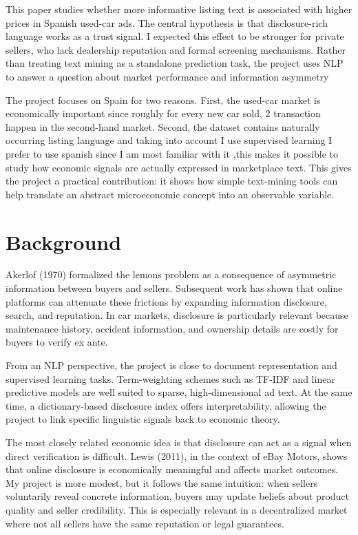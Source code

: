 \documentclass[10pt,twocolumn]{article}
\begin{document}
This paper studies whether more informative listing text is associated with higher prices in Spanish used-car ads. The central hypothesis is that disclosure-rich language works as a trust signal. I expected this effect to be stronger for private sellers, who lack dealership reputation and formal screening mechanisms. Rather than treating text mining as a standalone prediction task, the project uses NLP to answer a question about market performance and information asymmetry

The project focuses on Spain for two reasons. First, the used-car market is economically important since roughly for every new car sold, 2 transaction happen in the second-hand market. Second, the dataset contains naturally occurring listing language and taking into account I use supervised learning I prefer to use spanish since I am most familiar with it ,this makes it possible to study how economic signals are actually expressed in marketplace text. This gives the project a practical contribution: it shows how simple text-mining tools can help translate an abstract microeconomic concept into an observable variable.

\section{Background}
Akerlof (1970) formalized the lemons problem as a consequence of asymmetric information between buyers and sellers. Subsequent work has shown that online platforms can attenuate these frictions by expanding information disclosure, search, and reputation. In car markets, disclosure is particularly relevant because maintenance history, accident information, and ownership details are costly for buyers to verify ex ante.

From an NLP perspective, the project is close to document representation and supervised learning tasks. Term-weighting schemes such as TF-IDF and linear predictive models are well suited to sparse, high-dimensional ad text. At the same time, a dictionary-based disclosure index offers interpretability, allowing the project to link specific linguistic signals back to economic theory.

The most closely related economic idea is that disclosure can act as a signal when direct verification is difficult. Lewis (2011), in the context of eBay Motors, shows that online disclosure is economically meaningful and affects market outcomes. My project is more modest, but it follows the same intuition: when sellers voluntarily reveal concrete information, buyers may update beliefs about product quality and seller credibility. This is especially relevant in a decentralized market where not all sellers have the same reputation or legal guarantees.
\end{document}
